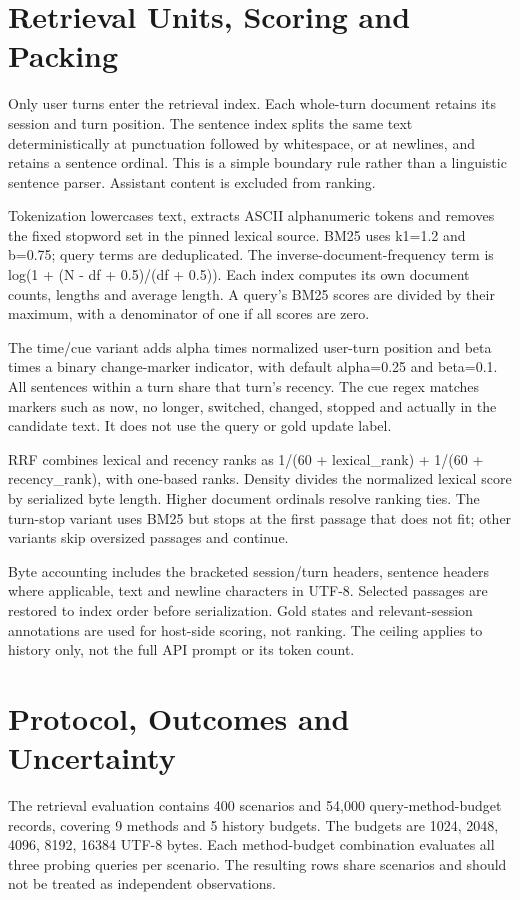 \documentclass{article}
\begin{document}
\section{Retrieval Units, Scoring and Packing}
Only user turns enter the retrieval index. Each whole-turn document retains its session and turn position. The sentence index splits the same text deterministically at punctuation followed by whitespace, or at newlines, and retains a sentence ordinal. This is a simple boundary rule rather than a linguistic sentence parser. Assistant content is excluded from ranking.

Tokenization lowercases text, extracts ASCII alphanumeric tokens and removes the fixed stopword set in the pinned lexical source. BM25 uses k1=1.2 and b=0.75; query terms are deduplicated. The inverse-document-frequency term is log(1 + (N - df + 0.5)/(df + 0.5)). Each index computes its own document counts, lengths and average length. A query's BM25 scores are divided by their maximum, with a denominator of one if all scores are zero.

The time/cue variant adds alpha times normalized user-turn position and beta times a binary change-marker indicator, with default alpha=0.25 and beta=0.1. All sentences within a turn share that turn's recency. The cue regex matches markers such as now, no longer, switched, changed, stopped and actually in the candidate text. It does not use the query or gold update label.

RRF combines lexical and recency ranks as 1/(60 + lexical\_rank) + 1/(60 + recency\_rank), with one-based ranks. Density divides the normalized lexical score by serialized byte length. Higher document ordinals resolve ranking ties. The turn-stop variant uses BM25 but stops at the first passage that does not fit; other variants skip oversized passages and continue.

Byte accounting includes the bracketed session/turn headers, sentence headers where applicable, text and newline characters in UTF-8. Selected passages are restored to index order before serialization. Gold states and relevant-session annotations are used for host-side scoring, not ranking. The ceiling applies to history only, not the full API prompt or its token count.

\section{Protocol, Outcomes and Uncertainty}
The retrieval evaluation contains 400 scenarios and 54,000 query-method-budget records, covering 9 methods and 5 history budgets. The budgets are 1024, 2048, 4096, 8192, 16384 UTF-8 bytes. Each method-budget combination evaluates all three probing queries per scenario. The resulting rows share scenarios and should not be treated as independent observations.
\end{document}
